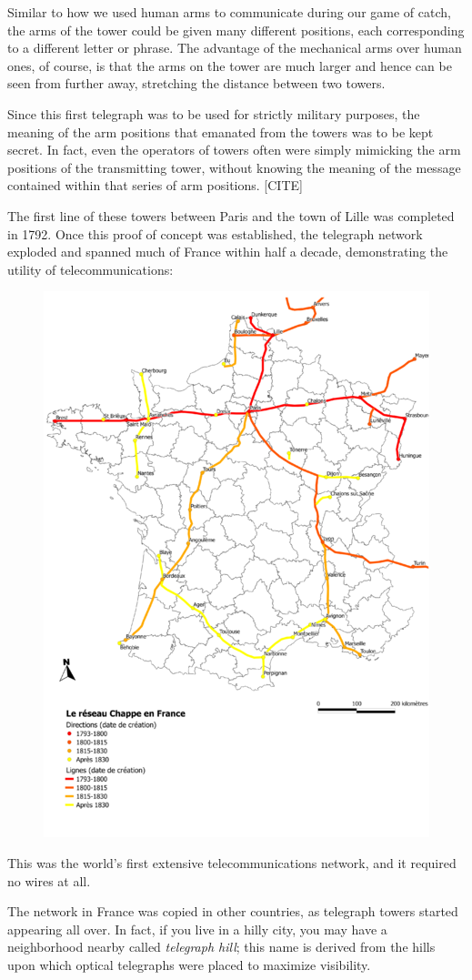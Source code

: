 \documentclass[UTF8]{book}
\begin{document}
\begin{CJK}{UTF8}{gbsn}
Similar to how we used human arms to communicate during our game of catch, the arms of the tower could be given many different positions, each corresponding to a different letter or phrase. The advantage of the mechanical arms over human ones, of course, is that the arms on the tower are much larger and hence can be seen from further away, stretching the distance between two towers.

Since this first telegraph was to be used for strictly military purposes, the meaning of the arm positions that emanated from the towers was to be kept secret. In fact, even the operators of towers often were simply mimicking the arm positions of the transmitting tower, without knowing the meaning of the message contained within that series of arm positions. [CITE]

The first line of these towers between Paris and the town of Lille was completed in 1792. Once this proof of concept was established, the telegraph network exploded and spanned much of France within half a decade, demonstrating the utility of telecommunications:

\begin{figure}[H]
\centering
\includegraphics[width=0.5\linewidth]{chappe_network}
\end{figure}

This was the world's first extensive telecommunications network, and it required no wires at all.

The network in France was copied in other countries, as telegraph towers started appearing all over. In fact, if you live in a hilly city, you may have a neighborhood nearby called \emph{telegraph hill}; this name is derived from the hills upon which optical telegraphs were placed to maximize visibility.


\end{CJK}
\end{document}
